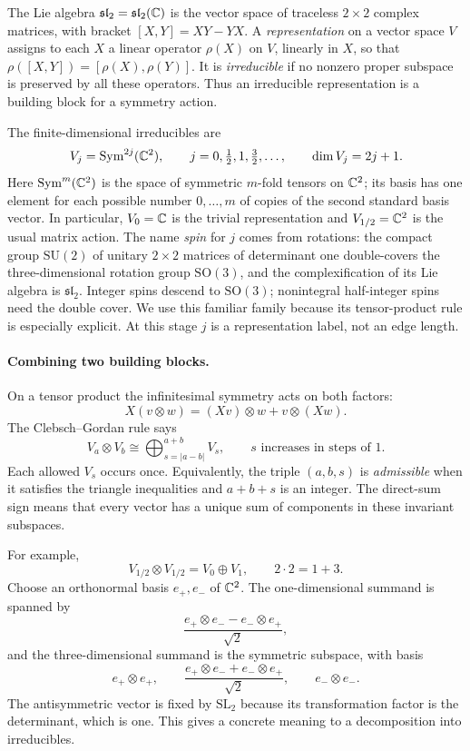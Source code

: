 The Lie algebra $\mathfrak{sl}_2=\mathfrak{sl}_2(\mathbb C)$ is the vector
space of traceless $2\times2$ complex matrices, with bracket
$[X,Y]=XY-YX$. A \emph{representation} on a vector space $V$ assigns
to each $X$ a linear operator $\rho(X)$ on $V$, linearly in $X$,
so that $\rho([X,Y])=[\rho(X),\rho(Y)]$. It is
\emph{irreducible} if no nonzero proper subspace is preserved by all
these operators. Thus an irreducible representation is a building
block for a symmetry action.

The finite-dimensional irreducibles are
\[
 V_j=\operatorname{Sym}^{2j}(\mathbb C^2),\qquad
 j=0,\tfrac12,1,\tfrac32,\ldots,\qquad \dim V_j=2j+1.
\]
Here $\operatorname{Sym}^m(\mathbb C^2)$ is the space of symmetric
$m$-fold tensors on $\mathbb C^2$; its basis has one element for each
possible number $0,\ldots,m$ of copies of the second standard basis
vector. In particular, $V_0=\mathbb C$ is the trivial representation and
$V_{1/2}=\mathbb C^2$ is the usual matrix action.
The name \emph{spin} for $j$ comes from rotations: the compact group
$\mathrm{SU}(2)$ of unitary $2\times2$ matrices of determinant one
double-covers the three-dimensional rotation group $\mathrm{SO}(3)$, and the complexification
of its Lie algebra is $\mathfrak{sl}_2$. Integer spins descend to
$\mathrm{SO}(3)$; nonintegral half-integer spins need the double cover.
We use this familiar family because its tensor-product rule is
especially explicit. At this stage $j$ is a representation label,
not an edge length.

\paragraph{Combining two building blocks.}
On a tensor product the infinitesimal symmetry acts on both factors:
\[
 X(v\otimes w)=(Xv)\otimes w+v\otimes(Xw).
\]
The Clebsch--Gordan rule says
\[
 V_a\otimes V_b
   \cong\bigoplus_{s=|a-b|}^{a+b}V_s,
 \qquad s\text{ increases in steps of }1.
\]
Each allowed $V_s$ occurs once. Equivalently, the triple $(a,b,s)$
is \emph{admissible} when it satisfies the triangle inequalities
and $a+b+s$ is an integer. The direct-sum sign means that every
vector has a unique sum of components in these invariant subspaces.

For example,
\[
 V_{1/2}\otimes V_{1/2}=V_0\oplus V_1,\qquad 2\cdot2=1+3.
\]
Choose an orthonormal basis $e_+,e_-$ of $\mathbb C^2$. The one-dimensional
summand is spanned by
\[
 \frac{e_+\otimes e_- - e_-\otimes e_+}{\sqrt2},
\]
and the three-dimensional summand is the symmetric subspace, with
basis
\[
 e_+\otimes e_+,\qquad
 \frac{e_+\otimes e_-+e_-\otimes e_+}{\sqrt2},\qquad
 e_-\otimes e_-.
\]
The antisymmetric vector is fixed by $\mathrm{SL}_2$ because its
transformation factor is the determinant, which is one.
This gives a concrete meaning to a decomposition into irreducibles.

